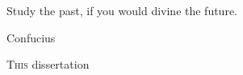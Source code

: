 \setlength{\epigraphwidth}{7.5cm}
\epigraph{Study the past, if you would divine the future.}{Confucius}

\ifpdf
    \graphicspath{{X/figures/PNG/}{X/figures/PDF/}{X/figures/}}
\else
    \graphicspath{{X/figures/EPS/}{X/figures/}}
\fi

\lettrine{T}{his} dissertation 

\newpage\thispagestyle{empty}
